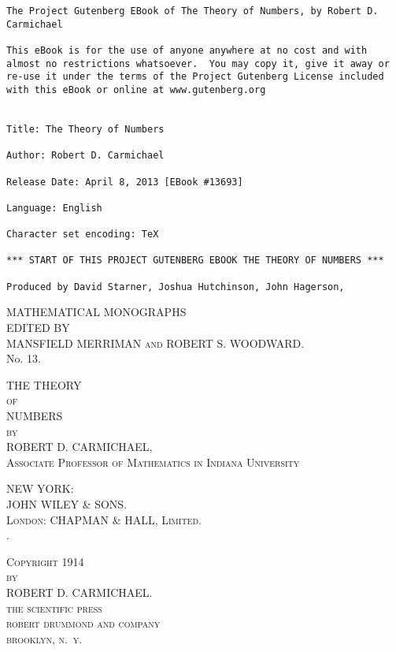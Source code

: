 \documentclass[oneside]{book}
\begin{document}
\thispagestyle{empty}
\small
\begin{verbatim}
The Project Gutenberg EBook of The Theory of Numbers, by Robert D. Carmichael

This eBook is for the use of anyone anywhere at no cost and with
almost no restrictions whatsoever.  You may copy it, give it away or
re-use it under the terms of the Project Gutenberg License included
with this eBook or online at www.gutenberg.org


Title: The Theory of Numbers

Author: Robert D. Carmichael

Release Date: April 8, 2013 [EBook #13693]

Language: English

Character set encoding: TeX

*** START OF THIS PROJECT GUTENBERG EBOOK THE THEORY OF NUMBERS ***

Produced by David Starner, Joshua Hutchinson, John Hagerson,
\end{verbatim}
\normalsize
\newpage

\frontmatter

\begin{center}
\noindent \Large MATHEMATICAL MONOGRAPHS \\

\bigskip \footnotesize{EDITED BY} \\
\normalsize \textsc{MANSFIELD MERRIMAN and ROBERT S. WOODWARD.} \\

\bigskip\bigskip \huge
No. 13.

\bigskip\bigskip \huge THE THEORY \\
\bigskip\small \textsc{of}  \\
\bigskip\huge NUMBERS \\

\bigskip\bigskip\footnotesize\textsc{by} \\
\bigskip\large ROBERT D. CARMICHAEL, \\
\footnotesize\textsc{Associate Professor of Mathematics in Indiana
University}

\bigskip\bigskip\normalsize NEW YORK: \\
\medskip JOHN WILEY \& SONS. \\
\medskip \textsc{London: CHAPMAN \& HALL, Limited.} \\
.

\bigskip\bigskip
\tiny \textsc{Copyright 1914} \\
\textsc{by} \\
ROBERT D. CARMICHAEL. \\
\medskip \textsc{the scientific press} \\
\textsc{robert drummond and company} \\
\textsc{brooklyn, n.~y.}
\end{center}
\end{document}
